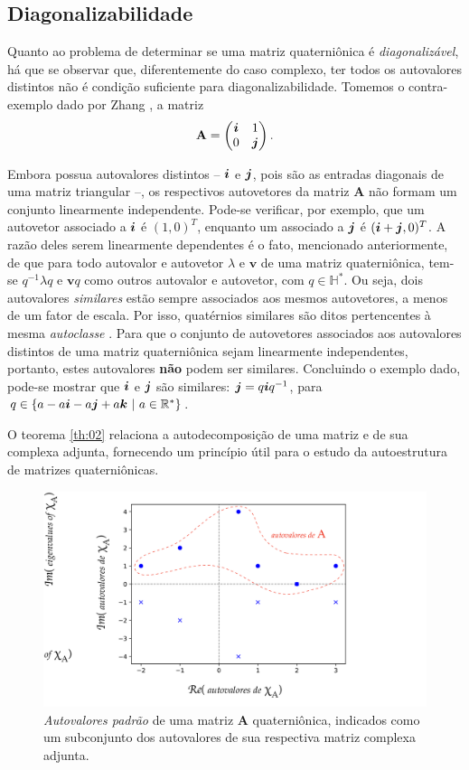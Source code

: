 \subsection{Diagonalizabilidade}
\label{subsec:autovetores_XA}

Quanto ao problema de determinar se uma matriz quaterni\^onica \'e \emph{diagonaliz\'avel}, h\'a que se observar que, diferentemente do caso complexo, ter todos os autovalores distintos n\~ao \'e condi\c c\~ao suficiente para diagonalizabilidade. Tomemos o contra-exemplo dado por Zhang \cite[Exemplo 7.4]{zhang1997quaternions}, a matriz
\begin{equation}
\mathbf{A} =
\begin{pmatrix}
\boldsymbol{i} & 1\\ 
0 & \boldsymbol{j}
\end{pmatrix}.
\end{equation}

Embora possua autovalores distintos -- $ \boldsymbol{i} $ e $ \boldsymbol{j} $, pois s\~ao as entradas diagonais de uma matriz triangular --, os respectivos autovetores da matriz $ \mathbf{A} $ n\~ao formam um conjunto linearmente independente. Pode-se verificar, por exemplo, que um autovetor associado a $ \boldsymbol{i} $ \'e $ (1, 0)^T $, enquanto um associado a $ \boldsymbol{j} $ \'e $ (\boldsymbol{i} + \boldsymbol{j}, 0)^T $. A raz\~ao deles serem linearmente dependentes \'e o fato, mencionado anteriormente, de que para todo autovalor e autovetor $ \lambda $ e $ \mathbf{v} $ de uma matriz quaterni\^onica, tem-se $ q^{-1}\lambda q $ e $ \mathbf{v}q $ como outros autovalor e autovetor, com $ q \in \mathbb{H}^\ast $. Ou seja, dois autovalores \emph{similares} est\~ao sempre associados aos mesmos autovetores, a menos de um fator de escala. Por isso, quat\'ernios similares s\~ao ditos pertencentes \`a mesma \emph{autoclasse} \cite{de2000right}. Para que o conjunto de autovetores associados aos autovalores distintos de uma matriz quaterni\^onica sejam linearmente independentes, portanto, estes autovalores \textbf{n\~ao} podem ser similares.  Concluindo o exemplo dado, pode-se mostrar que $ \boldsymbol{i} $ e $ \boldsymbol{j} $ s\~ao similares: $ \boldsymbol{j} = q \boldsymbol{i} q^{-1} $, para $ q \in \{ a - a\boldsymbol{i} - a\boldsymbol{j} + a\boldsymbol{k} \ | \ a\in \mathbb{R}^\ast \} $.

O teorema \ref{th:02} relaciona a autodecomposi\c c\~ao de uma matriz e de sua complexa adjunta, fornecendo um princ\'ipio \'util para o estudo da autoestrutura de matrizes quaterni\^onicas.


\begin{figure}
\centering
\includegraphics[width=0.6\linewidth]{Figures/complex_adjoint_eigvals_PT.pdf}
\caption{\emph{Autovalores padrão} de uma matriz $ \mathbf{A} $ quaterni\^onica, indicados como um subconjunto dos autovalores de sua respectiva matriz complexa adjunta.}
\end{figure}



